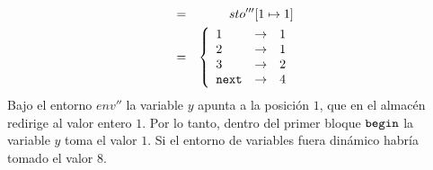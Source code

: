 \begin{example}
\begin{eqnarray*}
    &=& sto'''[1 \mapsto 1] \\
    &=& \left\{\begin{array}{lcl}
         1 & \to & 1 \\
         2 & \to & 1 \\
         3 & \to & 2 \\
         \texttt{next} & \to & 4
    \end{array}\right.
\end{eqnarray*}
Bajo el entorno $env''$ la variable $y$ apunta a la posición $1$, que en el almacén redirige al valor entero $1$. Por lo tanto, dentro del primer bloque $\texttt{begin}$ la variable $y$ toma el valor $1$. Si el entorno de variables fuera dinámico habría tomado el valor $8$.
\end{example}